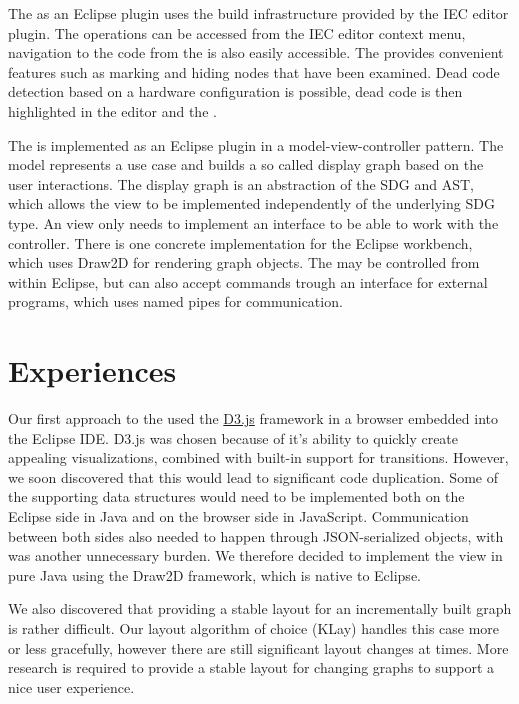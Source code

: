The \SB as an Eclipse plugin uses the build infrastructure provided by the IEC editor plugin. The \SB operations can be 
accessed from the IEC editor context menu, navigation to the code from the \SB is also easily accessible. The \SB 
provides convenient features such as marking and hiding nodes that have been examined. Dead code detection based on a 
hardware configuration is possible, dead code is then highlighted in the editor and the \SB.

The \SB is implemented as an Eclipse plugin in a model-view-controller pattern. The model represents a use case and 
builds a so called display graph based on the user interactions. The display graph is an abstraction of the SDG and 
AST, which allows the view to be implemented independently of the underlying SDG type. An \SB view only needs to 
implement an interface to be able to work with the controller. There is one concrete implementation for the Eclipse 
workbench, which uses Draw2D for rendering graph objects. The \SB may be controlled from within Eclipse, but can also 
accept commands trough an interface for external programs, which uses named pipes for communication.

\section{Experiences}

Our first approach to the \SB used the \href{https://d3js.org/}{D3.js} framework in a browser embedded into the Eclipse 
IDE\footnotemark. D3.js was chosen because of it's ability to quickly create appealing visualizations, combined with 
built-in support for transitions. However, we soon discovered that this would lead to significant code duplication. 
Some of the supporting data structures would need to be implemented both on the Eclipse side in Java and on the 
browser side in JavaScript. Communication between both sides also needed to happen through JSON-serialized objects, 
with was another unnecessary burden. We therefore decided to implement the view in pure Java using the Draw2D 
framework, which is native to Eclipse.


We also discovered that providing a stable layout for an incrementally built graph is rather difficult. Our layout 
algorithm of choice (KLay) handles this case more or less gracefully, however there are still significant layout 
changes at times. More research is required to provide a stable layout for  changing graphs to support a nice user 
experience.
